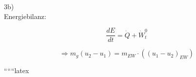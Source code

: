 3b) \\
Energiebilanz:

\[
\frac{dE}{dt} = \dot{Q} + \dot{W}_t^0
\]

\[
\Rightarrow m_g (u_2 - u_1) = m_{EW} \cdot \left( (u_1 - u_2)_{EW} \right)
\]

``````latex